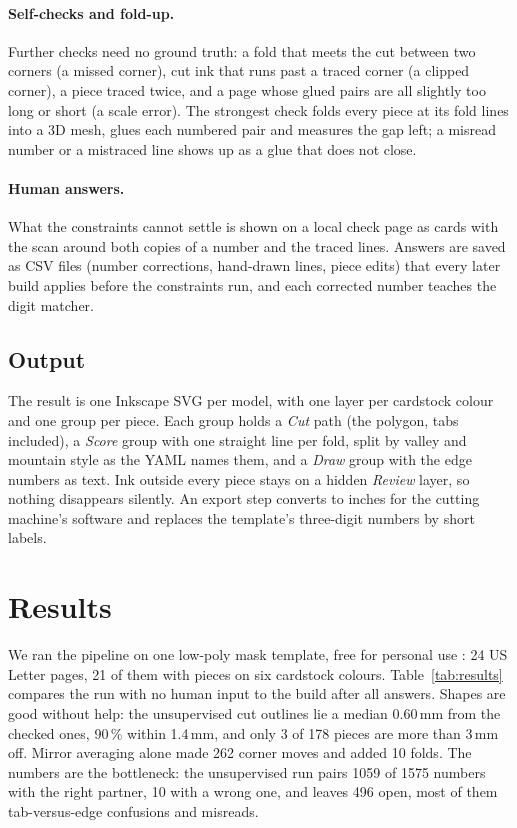 \paragraph{Self-checks and fold-up.} Further checks need no ground truth: a fold that meets the
cut between two corners (a missed corner), cut ink that runs past a traced corner (a clipped
corner), a piece traced twice, and a page whose glued pairs are all slightly too long or short
(a scale error). The strongest check folds every piece at its fold lines into a 3D mesh, glues
each numbered pair and measures the gap left; a misread number or a mistraced line shows up as a
glue that does not close.

\paragraph{Human answers.} What the constraints cannot settle is shown on a local check page as
cards with the scan around both copies of a number and the traced lines. Answers are saved as
CSV files (number corrections, hand-drawn lines, piece edits) that every later build applies
before the constraints run, and each corrected number teaches the digit matcher.

\subsection{Output}

The result is one Inkscape SVG per model, with one layer per cardstock colour and one group per
piece. Each group holds a \emph{Cut} path (the polygon, tabs included), a \emph{Score} group with
one straight line per fold, split by valley and mountain style as the YAML names them, and a
\emph{Draw} group with the edge numbers as text. Ink outside every piece stays on a hidden
\emph{Review} layer, so nothing disappears silently. An export step converts to inches for the
cutting machine's software and replaces the template's three-digit numbers by short labels.

\section{Results}

We ran the pipeline on one low-poly mask template, free for personal use
\cite{papercraftcat2017}: 24 US Letter pages, 21 of them with pieces on six cardstock colours.
Table~\ref{tab:results} compares the run with no human input to the build after all answers.
Shapes are good without help: the unsupervised cut outlines lie a median 0.60\,mm from the
checked ones, 90\,\% within 1.4\,mm, and only 3 of 178 pieces are more than 3\,mm off. Mirror
averaging alone made 262 corner moves and added 10 folds. The numbers are the bottleneck: the
unsupervised run pairs 1059 of 1575 numbers with the right partner, 10 with a wrong one, and
leaves 496 open, most of them tab-versus-edge confusions and misreads.


